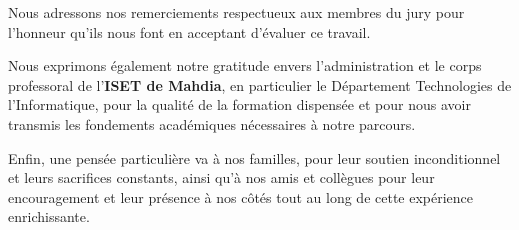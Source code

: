 \documentclass[a4paper,12pt,twoside]{report}
\begin{document}
\noindent
Nous adressons nos remerciements respectueux aux membres du jury pour l'honneur qu'ils nous font en acceptant d'évaluer ce travail.

\noindent
Nous exprimons également notre gratitude envers l'administration et le corps professoral de l'\textbf{ISET de Mahdia}, en particulier le Département Technologies de l'Informatique, pour la qualité de la formation dispensée et pour nous avoir transmis les fondements académiques nécessaires à notre parcours.

\noindent
Enfin, une pensée particulière va à nos familles, pour leur soutien inconditionnel et leurs sacrifices constants, ainsi qu'à nos amis et collègues pour leur encouragement et leur présence à nos côtés tout au long de cette expérience enrichissante.

\clearpage
\thispagestyle{preStyle}
\tableofcontents

\clearpage
\thispagestyle{preStyle}
\listoffigures

\clearpage
\thispagestyle{preStyle}
\listoftables
\end{document}
